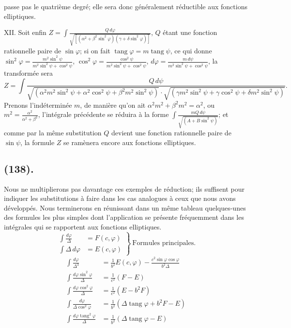 \documentclass{article}
\begin{document}
passe pas le quatrième degré; elle sera donc généralement réductible aux fonctions elliptiques.

XII. Soit enfin $Z=\displaystyle\int\frac{Q\,d\varphi}{\sqrt{[(\alpha^{2}+\beta^{2}\sin^{2}\varphi)(\gamma+\delta\sin^{2}\varphi)]}}$, $Q$ étant une fonction rationnelle paire de $\sin\varphi$; si on fait $\operatorname{tang}\varphi=m\operatorname{tang}\psi$, ce qui donne $\sin^{2}\varphi=\frac{m^{2}\sin^{2}\psi}{m^{2}\sin^{2}\psi+\cos^{2}\psi}$, $\cos^{2}\varphi=\frac{\cos^{2}\psi}{m^{2}\sin^{2}\psi+\cos^{2}\psi}$, $d\varphi=\frac{m\,d\psi}{m^{2}\sin^{2}\psi+\cos^{2}\psi}$, la transformée sera
\[ Z=\int\frac{Q\,d\psi}{\sqrt{(\alpha^{2}m^{2}\sin^{2}\psi+\alpha^{2}\cos^{2}\psi+\beta^{2}m^{2}\sin^{2}\psi)}\cdot\sqrt{(\gamma m^{2}\sin^{2}\psi+\gamma\cos^{2}\psi+\delta m^{2}\sin^{2}\psi)}}. \]
Prenons l'indéterminée $m$, de manière qu'on ait $\alpha^{2}m^{2}+\beta^{2}m^{2}=\alpha^{2}$, ou $m^{2}=\frac{\alpha^{2}}{\alpha^{2}+\beta^{2}}$, l'intégrale précédente se réduira à la forme $\displaystyle\int\frac{mQ\,d\psi}{\sqrt{(A+B\sin^{2}\psi)}}$; et comme par la même substitution $Q$ devient une fonction rationnelle paire de $\sin\psi$, la formule $Z$ se ramènera encore aux fonctions elliptiques.

\subsection*{(138).}

Nous ne multiplierons pas davantage ces exemples de réduction; ils suffisent pour indiquer les substitutions à faire dans les cas analogues à ceux que nous avons développés. Nous terminerons en réunissant dans un même tableau quelques-unes des formules les plus simples dont l'application se présente fréquemment dans les intégrales qui se rapportent aux fonctions elliptiques.
\[ \left.\begin{aligned} \int\frac{d\varphi}{\Delta}&=F(c,\varphi)\\ \int\Delta\,d\varphi&=E(c,\varphi) \end{aligned}\right\}\ \text{Formules principales.} \]
\[ \begin{aligned} \int\frac{d\varphi}{\Delta^{3}}&=\frac{1}{b^{2}}E(c,\varphi)-\frac{c^{2}\sin\varphi\cos\varphi}{b^{2}\Delta}\\ \int\frac{d\varphi\sin^{2}\varphi}{\Delta}&=\frac{1}{c^{2}}(F-E)\\ \int\frac{d\varphi\cos^{2}\varphi}{\Delta}&=\frac{1}{c^{2}}(E-b^{2}F)\\ \int\frac{d\varphi}{\Delta\cos^{2}\varphi}&=\frac{1}{b^{2}}(\Delta\operatorname{tang}\varphi+b^{2}F-E)\\ \int\frac{d\varphi\operatorname{tang}^{2}\varphi}{\Delta}&=\frac{1}{b^{2}}(\Delta\operatorname{tang}\varphi-E) \end{aligned} \]
\end{document}
